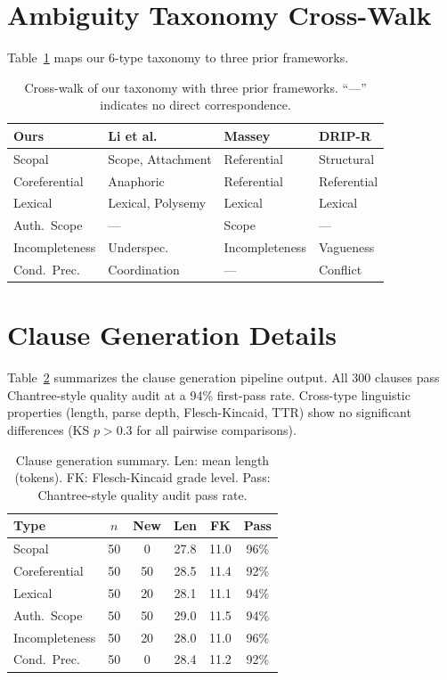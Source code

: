 \documentclass[11pt,a4paper]{article}
\begin{document}
\appendix
\section{Ambiguity Taxonomy Cross-Walk}
\label{app:crosswalk}

Table~\ref{tab:crosswalk} maps our 6-type taxonomy to three prior frameworks.

\begin{table}[h]
\centering
\small
\begin{tabular}{@{}llll@{}}
\toprule
\textbf{Ours} & \textbf{Li et al.} & \textbf{Massey} & \textbf{DRIP-R} \\
\midrule
Scopal & Scope, Attachment & Referential & Structural \\
Coreferential & Anaphoric & Referential & Referential \\
Lexical & Lexical, Polysemy & Lexical & Lexical \\
Auth.\ Scope & --- & Scope & --- \\
Incompleteness & Underspec. & Incompleteness & Vagueness \\
Cond.\ Prec. & Coordination & --- & Conflict \\
\bottomrule
\end{tabular}
\caption{Cross-walk of our taxonomy with three prior frameworks. ``---'' indicates no direct correspondence.}
\label{tab:crosswalk}
\end{table}

\section{Clause Generation Details}
\label{app:clause_gen}

Table~\ref{tab:clause_gen} summarizes the clause generation pipeline output.
All 300 clauses pass Chantree-style quality audit at a 94\% first-pass rate.
Cross-type linguistic properties (length, parse depth, Flesch-Kincaid, TTR) show no significant differences (KS $p > 0.3$ for all pairwise comparisons).

\begin{table}[h]
\centering
\small
\begin{tabular}{@{}lccccc@{}}
\toprule
\textbf{Type} & $n$ & \textbf{New} & \textbf{Len} & \textbf{FK} & \textbf{Pass} \\
\midrule
Scopal         & 50 & 0  & 27.8 & 11.0 & 96\% \\
Coreferential  & 50 & 50 & 28.5 & 11.4 & 92\% \\
Lexical        & 50 & 20 & 28.1 & 11.1 & 94\% \\
Auth.\ Scope   & 50 & 50 & 29.0 & 11.5 & 94\% \\
Incompleteness & 50 & 20 & 28.0 & 11.0 & 96\% \\
Cond.\ Prec.   & 50 & 0  & 28.4 & 11.2 & 92\% \\
\bottomrule
\end{tabular}
\caption{Clause generation summary. Len: mean length (tokens). FK: Flesch-Kincaid grade level. Pass: Chantree-style quality audit pass rate.}
\label{tab:clause_gen}
\end{table}
\end{document}
